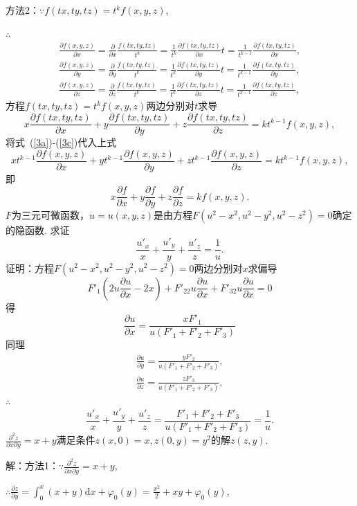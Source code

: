 \documentclass[12pt,UTF8]{ctexart}
\begin{document}
\begin{enumerate}
方法2：$\because f(tx,ty,tz)=t^kf(x,y,z)$,

$\therefore$
\begin{subequations}
\begin{align}
\frac{\partial f(x,y,z)}{\partial x}=\frac{\partial}{\partial x}\frac{f(tx,ty,tz)}{t^k}=\frac1{t^k}\frac{\partial f(tx,ty,tz)}{\partial x}t=\frac1{t^{k-1}}\frac{\partial f(tx,ty,tz)}{\partial x},\label{3a}\\
\frac{\partial f(x,y,z)}{\partial y}=\frac{\partial}{\partial y}\frac{f(tx,ty,tz)}{t^k}=\frac1{t^k}\frac{\partial f(tx,ty,tz)}{\partial y}t=\frac1{t^{k-1}}\frac{\partial f(tx,ty,tz)}{\partial y},\label{3b}\\
\frac{\partial f(x,y,z)}{\partial z}=\frac{\partial}{\partial z}\frac{f(tx,ty,tz)}{t^k}=\frac1{t^k}\frac{\partial f(tx,ty,tz)}{\partial z}t=\frac1{t^{k-1}}\frac{\partial f(tx,ty,tz)}{\partial z},\label{3c}
\end{align}
\end{subequations}
方程$f(tx,ty,tz)=t^kf(x,y,z)$两边分别对$t$求导
\[
x\frac{\partial f(tx,ty,tz)}{\partial x}+y\frac{\partial f(tx,ty,tz)}{\partial y}+z\frac{\partial f(tx,ty,tz)}{\partial z}=kt^{k-1}f(x,y,z),
\]
将式~(\ref{3a})-(\ref{3c})代入上式
\[
xt^{k-1}\frac{\partial f(x,y,z)}{\partial x}+yt^{k-1}\frac{\partial f(x,y,z)}{\partial y}+zt^{k-1}\frac{\partial f(x,y,z)}{\partial z}=kt^{k-1}f(x,y,z),
\]
即
\[
x\frac{\partial f}{\partial x}+y\frac{\partial f}{\partial y}+z\frac{\partial f}{\partial z}=kf(x,y,z).
\]
$F$为三元可微函数，$u=u(x,y,z)$是由方程$F(u^2-x^2,u^2-y^2,u^2-z^2)=0$确定的隐函数. 求证
\[
\frac{u'_x}{x}+\frac{u'_y}{y}+\frac{u'_z}{z}=\frac1u.
\]
证明：方程$F(u^2-x^2,u^2-y^2,u^2-z^2)=0$两边分别对$x$求偏导
\[
F'_1(2u\frac{\partial u}{\partial x}-2x)+F'_22u\frac{\partial u}{\partial x}+F'_32u\frac{\partial u}{\partial x}=0
\]
得
\[
\frac{\partial u}{\partial x}=\frac{xF'_1}{u(F'_1+F'_2+F'_3)}
\]
同理
\[\begin{split}
\frac{\partial u}{\partial y}=\frac{yF'_2}{u(F'_1+F'_2+F'_3)},\\
\frac{\partial u}{\partial z}=\frac{zF'_3}{u(F'_1+F'_2+F'_3)},
\end{split}\]
$\therefore$
\[
\frac{u'_x}{x}+\frac{u'_y}{y}+\frac{u'_z}{z}=\frac{F'_1+F'_2+F'_3}{u(F'_1+F'_2+F'_3)}=\frac1u.
\]
$\frac{\partial^2z}{\partial x\partial y}=x+y$满足条件$z(x,0)=x,z(0,y)=y^2$的解$z(z,y)$.

解：方法1：$\because\frac{\partial^2z}{\partial x\partial y}=x+y$,

$\therefore\frac{\partial z}{\partial y}=\int_0^x(x+y)\mathrm dx+\varphi_0(y)=\frac{x^2}2+xy+\varphi_0(y)$,


\end{enumerate}
\end{document}
